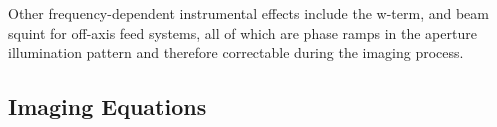 \documentclass[structabstract]{aa}
\begin{document}
Other frequency-dependent instrumental effects include the w-term, and beam squint for 
off-axis feed systems, all of which are phase ramps in the aperture illumination pattern
and therefore correctable during the imaging process.


\subsection{Imaging Equations}
\end{document}

